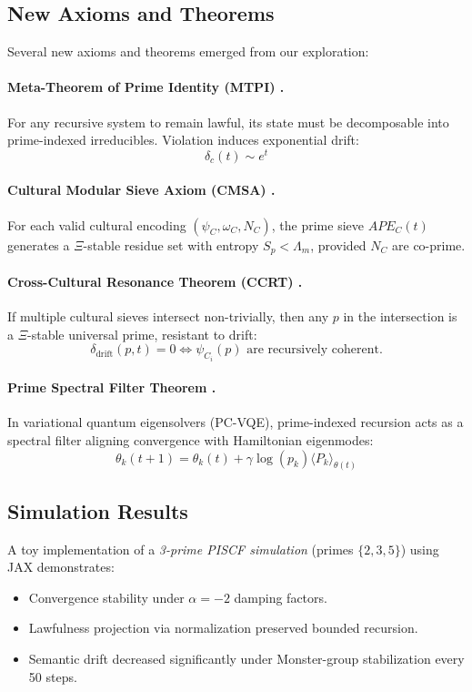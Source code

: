 \documentclass{article}
\theoremstyle{plain}
\begin{document}
\subsection{New Axioms and Theorems}

Several new axioms and theorems emerged from our exploration:  

\paragraph{Meta-Theorem of Prime Identity (MTPI) \cite{Advancements2,XiConstitution}.}  
For any recursive system to remain lawful, its state must be decomposable into prime-indexed irreducibles. Violation induces exponential drift:  
\[
\delta_c(t) \sim e^t
\]  

\paragraph{Cultural Modular Sieve Axiom (CMSA) \cite{Latest}.}  
For each valid cultural encoding $(\psi_C, \omega_C, N_C)$, the prime sieve $APE_C(t)$ generates a $\Xi$-stable residue set with entropy $S_p < \Lambda_m$, provided $N_C$ are co-prime.  

\paragraph{Cross-Cultural Resonance Theorem (CCRT) \cite{Latest}.}  
If multiple cultural sieves intersect non-trivially, then any $p$ in the intersection is a $\Xi$-stable universal prime, resistant to drift:
\[
\delta_{\text{drift}}(p,t) = 0 \iff \psi_{C_i}(p) \text{ are recursively coherent.}
\]  

\paragraph{Prime Spectral Filter Theorem \cite{PrimeAdvancements}.}  
In variational quantum eigensolvers (PC-VQE), prime-indexed recursion acts as a spectral filter aligning convergence with Hamiltonian eigenmodes:
\[
\theta_k(t+1) = \theta_k(t) + \gamma \log(p_k) \langle P_k \rangle_{\theta(t)}
\]  

\subsection{Simulation Results}

A toy implementation of a \emph{3-prime PISCF simulation} (primes $\{2,3,5\}$) using JAX demonstrates:  
\begin{itemize}
    \item Convergence stability under $\alpha = -2$ damping factors.  
    \item Lawfulness projection via normalization preserved bounded recursion.  
    \item Semantic drift decreased significantly under Monster-group stabilization every 50 steps.  
\end{itemize}
\end{document}
